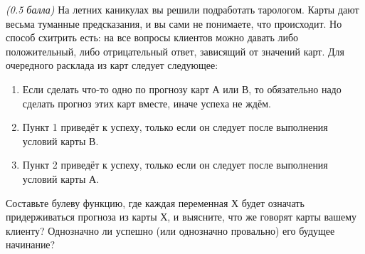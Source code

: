 \question
\textit{(0.5 балла)} На летних каникулах вы решили подработать тарологом. Карты дают весьма туманные предсказания, и вы сами не понимаете, что происходит. Но способ схитрить есть: на все вопросы клиентов можно давать либо положительный, либо отрицательный ответ, зависящий от значений карт. Для очередного расклада из карт следует следующее:

\begin{enumerate}
\item Если сделать что-то одно по прогнозу карт А или В, то обязательно надо сделать прогноз этих карт вместе, иначе успеха не ждём.
\item Пункт 1 приведёт к успеху, только если он следует после выполнения условий карты В.
\item Пункт 2 приведёт к успеху, только если он следует после выполнения условий карты А.
\end{enumerate}

Составьте булеву функцию, где каждая переменная Х будет означать \flqq придерживаться прогноза из карты Х\frqq, и выясните, что же говорят карты вашему клиенту? Однозначно ли успешно (или однозначно провально) его будущее начинание?